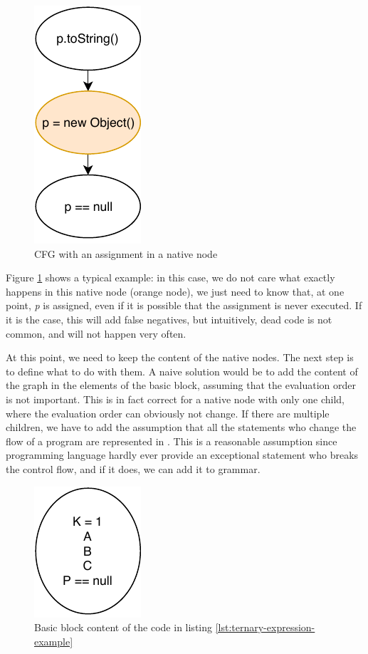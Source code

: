 \begin{figure}[h]
	\caption{CFG with an assignment in a native node}
	\label{figure:cfg-with-assignment-native}
	\includegraphics[]{figure/cfg-with-assignment-native.pdf}
\end{figure}

Figure \ref{figure:cfg-with-assignment-native} shows a typical example: in this case, we do not care what exactly happens in this native node (orange node), we just need to know that, at one point, \emph{p} is assigned, even if it is possible that the assignment is never executed.
If it is the case, this will add false negatives, but intuitively, dead code is not common, and will not happen very often.

At this point, we need to keep the content of the native nodes. 
The next step is to define what to do with them. 
A naive solution would be to add the content of the graph in the elements of the basic block, assuming that the evaluation order is not important. 
This is in fact correct for a native node with only one child, where the evaluation order can obviously not change. 
If there are multiple children, we have to add the assumption that all the statements who change the flow of a program are represented in \slang{}. 
This is a reasonable assumption since programming language hardly ever provide an exceptional statement who breaks the control flow, and if it does, we can add it to \slang{} grammar.



\begin{figure}[h]
	\caption{Basic block content of the code in listing \ref{lst:ternary-expression-example}}
	\label{figure:basic-block-content}
	\includegraphics[]{figure/basic-block-content.pdf}
\end{figure}


